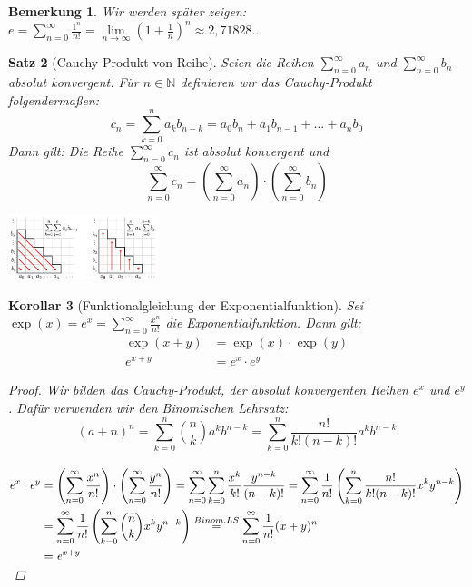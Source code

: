 \documentclass[a4paper,titlepage,oneside]{article}
\def\N{\ensuremath{\mathbb{N}} }
\def\e{\ensuremath{\mathit{e}} }
\newcommand{\suminf}[2][n]{\ensuremath{\sum_{#1= 0}^{\infty}{#2}}}
\renewcommand{\liminf}[2][n]{\ensuremath{\lim\limits_{#1 \rightarrow \infty}{#2}}}
\theoremstyle{thmstyle}
\newtheorem{satz}{Satz}[section]
\newtheorem{korr}[satz]{Korollar}
\newtheorem{bem}[satz]{Bemerkung}
\theoremstyle{subthmstyle}
\begin{document}
\begin{bem}
Wir werden später zeigen:
$  \displaystyle \e = \suminf{\frac{1^n}{n!}} = \liminf{\left(1 + \frac{1}{n}\right)^n} \approx 2,71828...$
\end{bem}

\begin{satz}[Cauchy-Produkt von Reihe]
Seien die Reihen $ \displaystyle \suminf{a_n}$ und $ \displaystyle \suminf{b_n}$ absolut konvergent. Für $n \in \N$ definieren wir das Cauchy-Produkt folgendermaßen:
\[c_n = \sum_{k = 0}^{n}{a_k b_{n-k}} = a_0 b_n + a_1b_{n-1} + \dots + a_n b_0\]
Dann gilt: Die Reihe $ \displaystyle \suminf{c_n}$ ist absolut konvergent und \\
\[\suminf{c_n} = \left( \suminf{a_n} \right) \cdot \left( \suminf{b_n} \right)\]
\proof[Beweisidee:]
\begin{center}
 \includegraphics[width=0.33\textwidth]{images/Beweisidee_Cauchy_Produkt.JPG}
\end{center}
\end{satz}

\begin{korr}[Funktionalgleichung der Exponentialfunktion]
Sei $ \displaystyle \exp(x) = \e^x = \suminf{\frac{x^n}{n!}}$ die Exponentialfunktion. Dann gilt:
\begin{align*}
\exp(x+y) &= \exp(x) \cdot \exp(y) \\
\e^{x+y} &= \e^x \cdot \e^y
\end{align*}
\begin{proof}
Wir bilden das Cauchy-Produkt, der absolut konvergenten Reihen $\e^x$ und $\e^y$. Dafür verwenden wir den Binomischen Lehrsatz:
\[(a+n)^n = \sum_{k=0}^{n}{\binom{n}{k}a^kb^{n-k}} = \sum_{k = 0}^{n}{\frac{n!}{k!(n-k)!}a^kb^{n-k}}\] \\
\begin{math}\displaystyle \begin{aligned}[t]
\e^x \cdot \e^y &= \left(\suminf{\frac{x^n}{n!}}\right) \cdot \left(\suminf{\frac{y^n}{n!}}\right) = \suminf{\sum_{k = 0}^{n}{\frac{x^k}{k!}\frac{y^{n-k}}{(n-k)!}}} = \suminf{\frac{1}{n!}\left(\sum_{k = 0}^{n}{\frac{n!}{k!(n-k)!}x^ky^{n-k}}\right)} \\
&= \suminf{\frac{1}{n!}\left(\sum_{k = 0}^{n}{\binom{n}{k}x^ky^{n-k}}\right)} \overset{Binom.LS}{=} \suminf{\frac{1}{n!}(x+y)^n} \\
&= \e^{x+y}
\end{aligned}\\
\end{math} 
\end{proof}
\end{korr}
\end{document}

